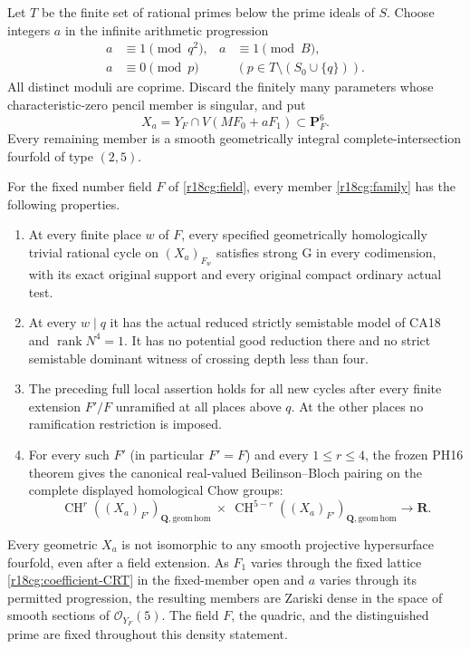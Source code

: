 Let $T$ be the finite set of rational primes below the
prime ideals of $S$.  Choose integers $a$ in the infinite
arithmetic progression
\[
 \begin{aligned}
 a&\equiv1\pmod{q^2},&
 a&\equiv1\pmod B,\\
 a&\equiv0\pmod p&&
       (p\in T\setminus(S_0\cup\{q\})).
 \end{aligned}
 \tag{CG18.7}\label{r18cg:parameter-CRT}
\]
All distinct moduli are coprime.  Discard the finitely
many parameters whose characteristic-zero pencil member
is singular, and put
\[
    X_a=Y_F\cap V(MF_0+aF_1)\subset\mathbf P^6_F.
 \tag{CG18.8}\label{r18cg:family}
\]
Every remaining member is a smooth geometrically integral
complete-intersection fourfold of type $(2,5)$.

\begin{theorem}
\label{r18cg:height-family}
For the fixed number field $F$ of \eqref{r18cg:field},
every member \eqref{r18cg:family} has the following properties.
\begin{enumerate}
\item At every finite place $w$ of $F$, every specified
      geometrically homologically trivial rational cycle on
      $(X_a)_{F_w}$ satisfies strong G in every codimension,
      with its exact original support and every original
      compact ordinary actual test.
\item At every $w\mid q$ it has the actual reduced strictly
      semistable model of CA18 and
      $\operatorname{rank}N^4=1$.  It has no potential good
      reduction there and no strict semistable dominant
      witness of crossing depth less than four.
\item The preceding full local assertion holds for all new
      cycles after every finite extension $F'/F$ unramified
      at all places above $q$.  At the other places no
      ramification restriction is imposed.
\item For every such $F'$ (in particular $F'=F$) and every
      $1\le r\le4$, the frozen PH16 theorem gives the
      canonical real-valued Beilinson--Bloch pairing on
      the complete displayed homological Chow groups:
      \[
      \operatorname{CH}^r((X_a)_{F'})_{\mathbf Q,\mathrm{geom\,hom}}
       \ \times\
      \operatorname{CH}^{5-r}((X_a)_{F'})_{\mathbf Q,\mathrm{geom\,hom}}
                        \longrightarrow\mathbf R.
      \tag{CG18.9}\label{r18cg:height}
      \]
\end{enumerate}
Every geometric $X_a$ is not isomorphic to any smooth
projective hypersurface fourfold, even after a field
extension.  As $F_1$ varies through the fixed lattice
\eqref{r18cg:coefficient-CRT} in the fixed-member open
and $a$ varies through its permitted progression, the
resulting members are Zariski dense in the space of
smooth sections of $\mathcal O_{Y_F}(5)$.
The field $F$, the quadric, and the distinguished prime
are fixed throughout this density statement.
\end{theorem}

